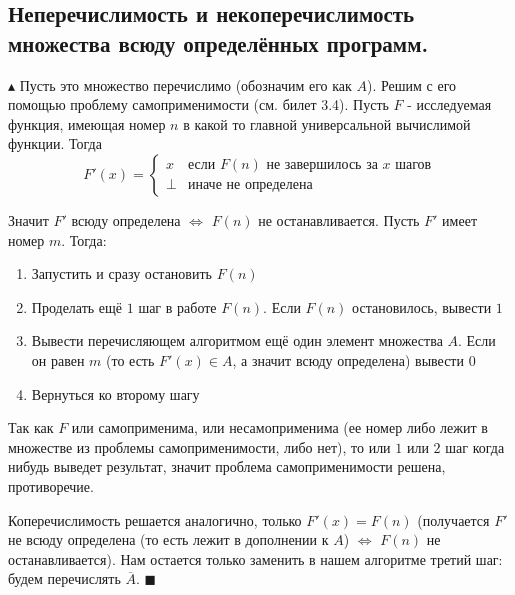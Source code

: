 \subsection{Неперечислимость и некоперечислимость множества всюду определённых программ.}
\par$\blacktriangle$ Пусть это множество перечислимо (обозначим его как $A$). Решим с его помощью проблему самоприменимости (см. билет 3.4). Пусть $F$ - исследуемая функция, имеющая номер $n$ в какой то главной универсальной вычислимой функции. 
Тогда $$F'(x) = \begin{cases} 
x & \text{если $F(n)$ не завершилось за $x$ шагов}\\
\bot & \text{иначе не определена}
\end{cases}$$
\par Значит $F'$ всюду определена $\Leftrightarrow$ $F(n)$ не останавливается.
Пусть $F'$ имеет номер $m$. Тогда: \begin{enumerate}
    \item Запустить и сразу остановить $F(n)$
    \item Проделать ещё $1$ шаг в работе $F(n)$. Если $F(n)$ остановилось, вывести $1$
    \item Вывести перечисляющем алгоритмом ещё один элемент множества $A$. Если он равен $m$ (то есть $F'(x) \in A$, а значит всюду определена) вывести $0$
    \item Вернуться ко второму шагу
\end{enumerate}
Так как $F$ или самоприменима, или несамоприменима (ее номер либо лежит в множестве из проблемы самоприменимости, либо нет), то или $1$ или $2$ шаг когда нибудь выведет результат, значит проблема самоприменимости решена, противоречие.
\par Коперечислимость решается аналогично, только $F'(x) = F(n)$ (получается $F'$ не всюду определена (то есть лежит в дополнении к $A$) $\Leftrightarrow$ $F(n)$ не останавливается). Нам остается только заменить в нашем алгоритме третий шаг: будем перечислять $\overline{A}$. $\blacksquare$